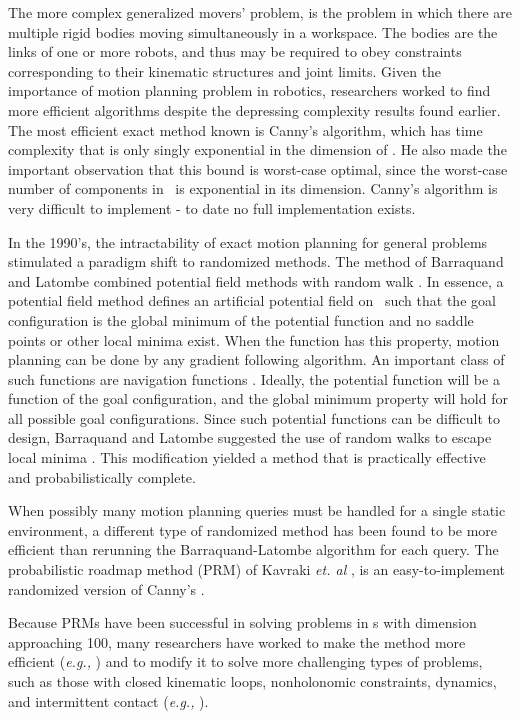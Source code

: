 The more complex generalized movers' problem, is the problem in
which there are multiple rigid bodies moving simultaneously in a
workspace. The bodies are the links of one or more robots, and
thus may be required to obey constraints corresponding to their
kinematic structures and joint limits. Given the importance of
motion planning problem in robotics, researchers worked to find
more efficient algorithms despite the depressing complexity
results found earlier. The most efficient exact method known is
Canny's algorithm, which has time complexity that is only singly
exponential in the dimension of \cspace \cite{Can88}. He also made
the important observation that this bound is worst-case optimal,
since the worst-case number of components in \cspace \ is
exponential in its dimension. Canny's algorithm is very difficult
to implement - to date no full implementation exists.

In the 1990's, the intractability of exact motion planning for
general problems stimulated a paradigm shift to randomized
methods. The method of Barraquand and Latombe combined potential
field methods with random walk \cite{BL91}.  In essence, a
potential field method defines an artificial potential field on
\cspace \ such that the goal configuration is the global minimum
of the potential function and no saddle points or other local
minima exist. When the function has this property, motion planning
can be done by any gradient following algorithm. An important
class of such functions are navigation functions
\cite{Koditschek87,RK88,RK89}. Ideally, the potential function
will be a function of the goal configuration, and the global
minimum property will hold for all possible goal configurations.
Since such potential functions can be difficult to design,
Barraquand and Latombe suggested the use of random walks to escape
local minima \cite{BL91}. This modification yielded a method that
is practically effective and probabilistically complete.

When possibly many motion planning queries must be handled for a
single static environment, a different type of randomized method
has been found to be more efficient than rerunning the
Barraquand-Latombe algorithm for each query. The probabilistic
roadmap method (PRM) of Kavraki {\em et. al} \cite{KSLO96}, is an
easy-to-implement randomized version of Canny's \cite{Can88}.

Because PRMs have been successful in solving problems in \cspace s
with dimension approaching 100, many researchers have worked to
make the method more efficient ({\em e.g.,}
\cite{ABDJV98,BOS99,BK00}) and to modify it to solve more
challenging types of problems, such as those with closed kinematic
loops, nonholonomic constraints, dynamics, and intermittent
contact ({\em e.g.,} \cite{YLK01,HA01,CG99,KL00,LK99,RRT}).

